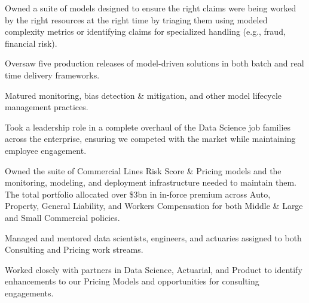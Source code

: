 \documentclass[letterpaper]{deedy-resume} %
\begin{document}
\begin{minipage}[t]{0.68\textwidth}
  \hfill
  \begin{tightitemize}
    \item Owned a suite of models designed to ensure the right claims were being worked
      by the right resources at the right time by triaging them using modeled complexity metrics or
      identifying claims for specialized handling (e.g., fraud, financial risk).
    \item Oversaw five production releases of model-driven solutions in both batch and real time
      delivery frameworks.
    \item Matured monitoring, bias detection \& mitigation, and other model lifecycle management practices.
    \item Took a leadership role in a complete overhaul of the Data Science job families
      across the enterprise, ensuring we competed  with the market while maintaining
      employee engagement.
  \end{tightitemize}
  \sectionspace
  
  \hfill
  \begin{tightitemize}
  \item Owned the suite of Commercial Lines Risk Score \& Pricing models
    and the monitoring, modeling, and deployment infrastructure needed
    to maintain them. The total portfolio allocated over \$3bn in in-force
    premium across Auto, Property, General Liability, and
    Workers Compensation for both Middle \& Large and Small Commercial
    policies.
  \item Managed and mentored data scientists, engineers, and actuaries assigned to both
   Consulting and Pricing work streams.
  \item Worked closely with partners in Data Science, Actuarial, and
    Product to identify enhancements to our Pricing Models and opportunities
    for consulting engagements.

  \end{tightitemize}
  \sectionspace

  

  

  


\end{minipage} %
\newpage
\end{document}
